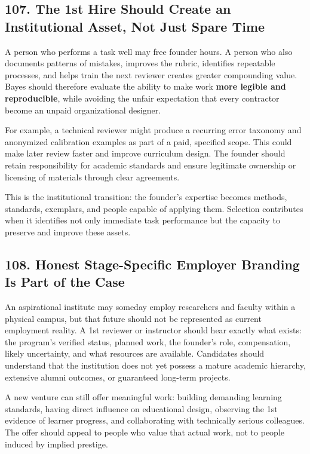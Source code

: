 \subsection*{107. The 1st Hire Should Create an Institutional Asset, Not Just Spare Time}

A person who performs a task well may free founder hours. A person who also documents patterns of mistakes, improves the rubric, identifies repeatable processes, and helps train the next reviewer creates greater compounding value. Bayes should therefore evaluate the ability to make work \textbf{more legible and reproducible}, while avoiding the unfair expectation that every contractor become an unpaid organizational designer.

For example, a technical reviewer might produce a recurring error taxonomy and anonymized calibration examples as part of a paid, specified scope. This could make later review faster and improve curriculum design. The founder should retain responsibility for academic standards and ensure legitimate ownership or licensing of materials through clear agreements.

This is the institutional transition: the founder's expertise becomes methods, standards, exemplars, and people capable of applying them. Selection contributes when it identifies not only immediate task performance but the capacity to preserve and improve these assets.

\subsection*{108. Honest Stage-Specific Employer Branding Is Part of the Case}

An aspirational institute may someday employ researchers and faculty within a physical campus, but that future should not be represented as current employment reality. A 1st reviewer or instructor should hear exactly what exists: the program's verified status, planned work, the founder's role, compensation, likely uncertainty, and what resources are available. Candidates should understand that the institution does not yet possess a mature academic hierarchy, extensive alumni outcomes, or guaranteed long-term projects.

A new venture can still offer meaningful work: building demanding learning standards, having direct influence on educational design, observing the 1st evidence of learner progress, and collaborating with technically serious colleagues. The offer should appeal to people who value that actual work, not to people induced by implied prestige.

